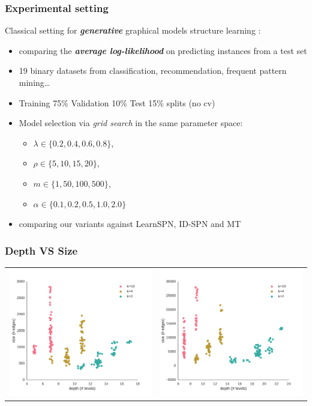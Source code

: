 \documentclass[xcolor={usenames,dvipsnames,svgnames}, compress]{beamer}
\begin{document}
\begin{frame}
  \frametitle{Experimental setting}
  \footnotesize
Classical setting for \emph{\textbf{generative}} graphical models
structure learning \parencite{Gens2013}:
  \begin{itemize}
    \itemsep 7pt
  \item comparing the \emph{\textbf{average log-likelihood}} on predicting instances from a test set
  \item 19 binary datasets from classification, recommendation,
    frequent pattern mining\dots \parencite{Lowd2010} \parencite{Haaren2012}
    \item Training 75\% Validation 10\% Test 15\%  splits (no cv)
  \item Model selection via \textit{grid search} in the same parameter space:
    \begin{itemize}
      \footnotesize
    \item $\lambda \in \{0.2, 0.4, 0.6, 0.8\}$,
    \item $\rho \in \{5, 10, 15, 20\}$, 
    \item $m \in \{1, 50, 100, 500\}$, 
    \item $\alpha \in \{ 0.1, 0.2, 0.5, 1.0, 2.0\}$
    \end{itemize}
  \item comparing our variants against \textsf{LearnSPN},
    \textsf{ID-SPN} and \textsf{MT}~\parencite{Meila2000}
  \end{itemize}

\end{frame}
\begin{frame}
  \frametitle{Depth VS Size}
  \begin{table}[ht]
    \centering
    \begin{tabular}{c c}
      \includegraphics[width=0.5\linewidth]{figures/nltcs-depth.pdf}&\includegraphics[width=0.5\linewidth]{figures/plants-depth.pdf}
    \end{tabular}
  \end{table}
\end{frame}
\end{document}
